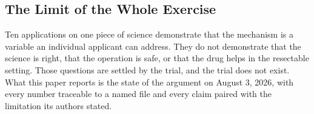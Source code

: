 \subsection{The Limit of the Whole Exercise}

Ten applications on one piece of science demonstrate that the mechanism is a
variable an individual applicant can address. They do not demonstrate that the
science is right, that the operation is safe, or that the drug helps in the
resectable setting. Those questions are settled by the trial, and the trial does
not exist. What this paper reports is the state of the argument on August 3,
2026, with every number traceable to a named file and every claim paired with
the limitation its authors stated.
